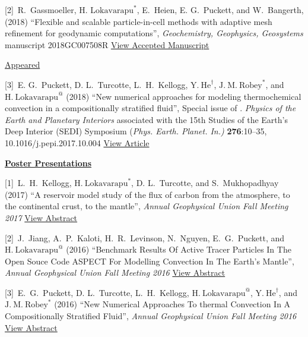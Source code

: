 \documentclass[11pt]{ltxdoc}
\begin{document}
\hangindent 20pt
[2]~R.~Gassmoeller,  $\textrm{H.~Lokavarapu}^*$, E.~Heien, E. G.~Puckett, and W.~Bangerth, (2018) 
``Flexible and scalable particle-in-cell methods with adaptive mesh refinement for geodynamic computations'', 
\textit{Geochemistry, Geophysics, Geosystems} manuscript 2018GC007508R 
\href{https://www.math.ucdavis.edu/~egp/PUBLICATIONS/JOURNAL_ARTICLES/ACCEPTED/RG-HL-EH-EGP-WB-2018.pdf}{View Accepted Manuscript}

\noindent
\underline{Appeared}

\vskip 06pt

\hangindent 20pt
[3]~E. G.~Puckett, D. L.~Turcotte, L.~H.~Kellogg,  $\mathrm{Y.~He}^{\dagger}$, $\mathrm{J.~M.~Robey}^{*}$, and 
$\mathrm{H.~Lokavarapu}^{@}$ (2018)
``New numerical approaches for modeling thermochemical convection in a compositionally stratified fluid'', 
Special issue of . \textit{Physics of the Earth and Planetary Interiors} associated with the 15th Studies of the Earth's Deep Interior (SEDI) Symposium (\textit{Phys. Earth. Planet. In.)} \textbf{276}:10–35, 10.1016/j.pepi.2017.10.004
\href{https://www.math.ucdavis.edu/~egp/PUBLICATIONS/JOURNAL_ARTICLES/APPEARED/2018/EGP-DLT-YH-HL-JMR-LHK-2018.pdf}{View Article}

\noindent
\textbf{\underline{Poster Presentations}}


\hangindent 20pt
[1]~L.~H.~Kellogg, $\mathrm{H.~Lokavarapu}^{*}$, D. L.~Turcotte, and S.~Mukhopadhyay (2017) 
``A reservoir model study of the flux of carbon from the atmosphere, to the continental crust, to the mantle'', 
\textit{Annual Geophysical Union Fall Meeting 2017}
\href{http://adsabs.harvard.edu/abs/2017AGUFMDI14A..06K}{View Abstract}

\hangindent 20pt
[2]~J.~Jiang, A.~P.~Kaloti, H.~R.~Levinson, N.~Nguyen, E.~G.~Puckett, and $\mathrm{H.~Lokavarapu}^{@}$ (2016) 
``Benchmark Results Of Active Tracer Particles In The Open Souce Code ASPECT For Modelling Convection In The Earth's Mantle'', 
\textit{Annual Geophysical Union Fall Meeting 2016}
\href{http://adsabs.harvard.edu/abs/2016AGUFM.T23C2946J}{View Abstract}

\hangindent 20pt
[3]~E.~G.~Puckett, D. L.~Turcotte, L.~H.~Kellogg, $\mathrm{H.~Lokavarapu}^{@}$,  $\mathrm{Y.~He}^{\dagger}$, and $\mathrm{J.~M.~Robey}^{*}$ (2016) 
``New Numerical Approaches To thermal Convection In A Compositionally Stratified Fluid'', 
\textit{Annual Geophysical Union Fall Meeting 2016}
\href{http://adsabs.harvard.edu/abs/2016AGUFMDI23A2589P}{View Abstract}
\end{document}

